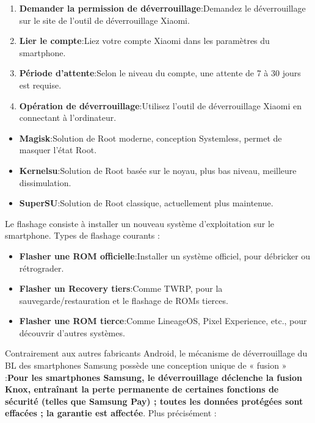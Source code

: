 
\begin{enumerate}
  \item \textbf{Demander la permission de déverrouillage}:Demandez le déverrouillage sur le site de l'outil de déverrouillage Xiaomi.
  \item \textbf{Lier le compte}:Liez votre compte Xiaomi dans les paramètres du smartphone.
  \item \textbf{Période d'attente}:Selon le niveau du compte, une attente de 7 à 30 jours est requise.
  \item \textbf{Opération de déverrouillage}:Utilisez l'outil de déverrouillage Xiaomi en connectant à l'ordinateur.
\end{enumerate}


\begin{itemize}
  \item \textbf{Magisk}:Solution de Root moderne, conception Systemless, permet de masquer l'état Root.
  \item \textbf{Kernelsu}:Solution de Root basée sur le noyau, plus bas niveau, meilleure dissimulation.
  \item \textbf{SuperSU}:Solution de Root classique, actuellement plus maintenue.
\end{itemize}


Le flashage consiste à installer un nouveau système d'exploitation sur le smartphone. Types de flashage courants :

\begin{itemize}
  \item \textbf{Flasher une ROM officielle}:Installer un système officiel, pour débricker ou rétrograder.
  \item \textbf{Flasher un Recovery tiers}:Comme TWRP, pour la sauvegarde/restauration et le flashage de ROMs tierces.
  \item \textbf{Flasher une ROM tierce}:Comme LineageOS, Pixel Experience, etc., pour découvrir d'autres systèmes.
\end{itemize}


Contrairement aux autres fabricants Android, le mécanisme de déverrouillage du BL des smartphones Samsung possède une conception unique de « fusion » :\textbf{Pour les smartphones Samsung, le déverrouillage déclenche la fusion Knox, entraînant la perte permanente de certaines fonctions de sécurité (telles que Samsung Pay) ; toutes les données protégées sont effacées ; la garantie est affectée}. Plus précisément :

